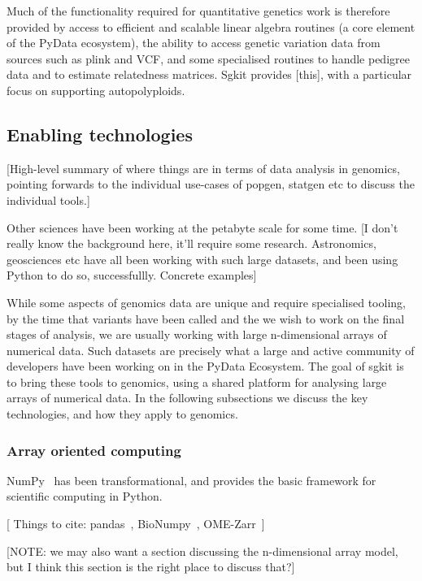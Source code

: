 \documentclass[a4paper,num-refs]{oup-contemporary}
\begin{document}
Much of the functionality required for quantitative genetics work
is therefore provided by access to efficient and scalable linear algebra
routines (a core element of the PyData ecosystem), the ability
to access genetic variation data from sources such as plink and VCF,
and some specialised routines to handle pedigree data and to
estimate relatedness matrices. Sgkit provides [this], with a particular
focus on supporting autopolyploids.




\subsection{Enabling technologies}

[High-level summary of where things are in terms of data analysis
in genomics, pointing forwards to
the individual use-cases of popgen, statgen etc to discuss the
individual tools.]

Other sciences have been working at the petabyte scale for some time.
[I don't really know the background here, it'll require some research.
Astronomics, geosciences etc have all been working with such large
datasets, and been using Python to do so, successfullly. Concrete
examples]

While some aspects of genomics data are unique and require specialised
tooling, by the time that variants have been called and the we wish
to work on the final stages of analysis, we are usually
working with large n-dimensional arrays of numerical data. Such
datasets are precisely what a large and active community of
developers have been working on in the PyData Ecosystem. The goal
of sgkit is to bring these tools to genomics, using a
shared platform for analysing large arrays of numerical data. In the
following subsections we discuss the key technologies, and how
they apply to genomics.

\subsubsection{Array oriented computing}

NumPy~\citep{harris2020array} has been transformational, and provides
the basic framework for scientific computing in Python.

[ Things to cite: pandas~\citep{mckinney2010data},
BioNumpy~\citep{rand2022bionumpy}, OME-Zarr~\citep{moore2023ome}]

[NOTE: we may also want a section discussing the n-dimensional array model,
but I think this section is the right place to discuss that?]
\end{document}
